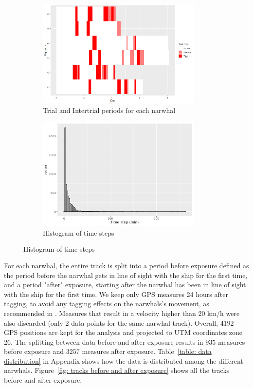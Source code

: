\documentclass[11pt]{article}
\newcommand {\1}{\mathbb{1}}
\begin{document}
\begin{figure}[H]
	\centering
	\begin{subfigure}{0.49\textwidth}
		\centering
		\includegraphics[width=0.9\textwidth]{images/data_exploration/trials.png}
		\caption{Trial and Intertrial periods for each narwhal}
		\label{fig: trials and intertrials distributions}
	\end{subfigure}
	\begin{subfigure}{0.49\textwidth}
		\centering
		\includegraphics[width=0.9\textwidth]{images/data_exploration/all_time_steps_histo}
		\caption{Histogram of time steps}
		\label{fig:alltimestepshisto}
	\end{subfigure}
\end{figure}


For each narwhal, the entire track is split into a period before exposure defined as the period before the narwhal gets in line of sight with the ship for the first time, and a period "after" exposure, starting after the narwhal has been in line of sight with the ship for the first time. We keep only GPS measures 24 
hours after tagging, to avoid any tagging effects on the narwhals's movement, as recommended in \cite{heide-jorgensen_behavioral_2021}.
Measures that result in a velocity higher than $20$ km/h were also discarded (only 2 data points for the same narwhal track).
Overall, $4192$ GPS positions are kept for the analysis and projected to UTM coordinates zone 26. The splitting between data before and after exposure results in $935$ measures before exposure and $3257$ measures after exposure. Table~\ref{table: data distribution} in Appendix shows how the data is distributed among the different narwhals. Figure~\ref{fig: tracks before and after exposure} shows all the tracks before and after exposure.
\end{document}
